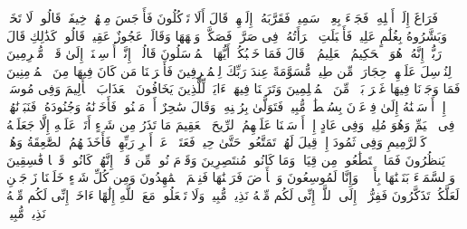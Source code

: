 \startbuffer[\q:51:26]
فَرَاغَ إِلَىٰۤ أَهۡلِهِۦ فَجَاۤءَ بِعِجۡلࣲ سَمِینࣲ%
\stopbuffer%
\startbuffer[\q:51:27]
فَقَرَّبَهُۥۤ إِلَیۡهِمۡ قَالَ أَلَا تَأۡكُلُونَ%
\stopbuffer%
\startbuffer[\q:51:28]
فَأَوۡجَسَ مِنۡهُمۡ خِیفَةࣰۖ قَالُوا۟ لَا تَخَفۡۖ وَبَشَّرُوهُ بِغُلَٰمٍ عَلِیمࣲ%
\stopbuffer%
\startbuffer[\q:51:29]
فَأَقۡبَلَتِ ٱمۡرَأَتُهُۥ فِی صَرَّةࣲ فَصَكَّتۡ وَجۡهَهَا وَقَالَتۡ عَجُوزٌ عَقِیمࣱ%
\stopbuffer%
\startbuffer[\q:51:30]
قَالُوا۟ كَذَٰلِكِ قَالَ رَبُّكِۖ إِنَّهُۥ هُوَ ٱلۡحَكِیمُ ٱلۡعَلِیمُ%
\stopbuffer%
\startbuffer[\q:51:31]
۞ قَالَ فَمَا خَطۡبُكُمۡ أَیُّهَا ٱلۡمُرۡسَلُونَ%
\stopbuffer%
\startbuffer[\q:51:32]
قَالُوۤا۟ إِنَّاۤ أُرۡسِلۡنَاۤ إِلَىٰ قَوۡمࣲ مُّجۡرِمِینَ%
\stopbuffer%
\startbuffer[\q:51:33]
لِنُرۡسِلَ عَلَیۡهِمۡ حِجَارَةࣰ مِّن طِینࣲ%
\stopbuffer%
\startbuffer[\q:51:34]
مُّسَوَّمَةً عِندَ رَبِّكَ لِلۡمُسۡرِفِینَ%
\stopbuffer%
\startbuffer[\q:51:35]
فَأَخۡرَجۡنَا مَن كَانَ فِیهَا مِنَ ٱلۡمُؤۡمِنِینَ%
\stopbuffer%
\startbuffer[\q:51:36]
فَمَا وَجَدۡنَا فِیهَا غَیۡرَ بَیۡتࣲ مِّنَ ٱلۡمُسۡلِمِینَ%
\stopbuffer%
\startbuffer[\q:51:37]
وَتَرَكۡنَا فِیهَاۤ ءَایَةࣰ لِّلَّذِینَ یَخَافُونَ ٱلۡعَذَابَ ٱلۡأَلِیمَ%
\stopbuffer%
\startbuffer[\q:51:38]
وَفِی مُوسَىٰۤ إِذۡ أَرۡسَلۡنَٰهُ إِلَىٰ فِرۡعَوۡنَ بِسُلۡطَٰنࣲ مُّبِینࣲ%
\stopbuffer%
\startbuffer[\q:51:39]
فَتَوَلَّىٰ بِرُكۡنِهِۦ وَقَالَ سَٰحِرٌ أَوۡ مَجۡنُونࣱ%
\stopbuffer%
\startbuffer[\q:51:40]
فَأَخَذۡنَٰهُ وَجُنُودَهُۥ فَنَبَذۡنَٰهُمۡ فِی ٱلۡیَمِّ وَهُوَ مُلِیمࣱ%
\stopbuffer%
\startbuffer[\q:51:41]
وَفِی عَادٍ إِذۡ أَرۡسَلۡنَا عَلَیۡهِمُ ٱلرِّیحَ ٱلۡعَقِیمَ%
\stopbuffer%
\startbuffer[\q:51:42]
مَا تَذَرُ مِن شَیۡءٍ أَتَتۡ عَلَیۡهِ إِلَّا جَعَلَتۡهُ كَٱلرَّمِیمِ%
\stopbuffer%
\startbuffer[\q:51:43]
وَفِی ثَمُودَ إِذۡ قِیلَ لَهُمۡ تَمَتَّعُوا۟ حَتَّىٰ حِینࣲ%
\stopbuffer%
\startbuffer[\q:51:44]
فَعَتَوۡا۟ عَنۡ أَمۡرِ رَبِّهِمۡ فَأَخَذَتۡهُمُ ٱلصَّٰعِقَةُ وَهُمۡ یَنظُرُونَ%
\stopbuffer%
\startbuffer[\q:51:45]
فَمَا ٱسۡتَطَٰعُوا۟ مِن قِیَامࣲ وَمَا كَانُوا۟ مُنتَصِرِینَ%
\stopbuffer%
\startbuffer[\q:51:46]
وَقَوۡمَ نُوحࣲ مِّن قَبۡلُۖ إِنَّهُمۡ كَانُوا۟ قَوۡمࣰا فَٰسِقِینَ%
\stopbuffer%
\startbuffer[\q:51:47]
وَٱلسَّمَاۤءَ بَنَیۡنَٰهَا بِأَیۡی۟دࣲ وَإِنَّا لَمُوسِعُونَ%
\stopbuffer%
\startbuffer[\q:51:48]
وَٱلۡأَرۡضَ فَرَشۡنَٰهَا فَنِعۡمَ ٱلۡمَٰهِدُونَ%
\stopbuffer%
\startbuffer[\q:51:49]
وَمِن كُلِّ شَیۡءٍ خَلَقۡنَا زَوۡجَیۡنِ لَعَلَّكُمۡ تَذَكَّرُونَ%
\stopbuffer%
\startbuffer[\q:51:50]
فَفِرُّوۤا۟ إِلَى ٱللَّهِۖ إِنِّی لَكُم مِّنۡهُ نَذِیرࣱ مُّبِینࣱ%
\stopbuffer%
\startbuffer[\q:51:51]
وَلَا تَجۡعَلُوا۟ مَعَ ٱللَّهِ إِلَٰهًا ءَاخَرَۖ إِنِّی لَكُم مِّنۡهُ نَذِیرࣱ مُّبِینࣱ%
\stopbuffer%
\startbuffer[\q:51:52]
